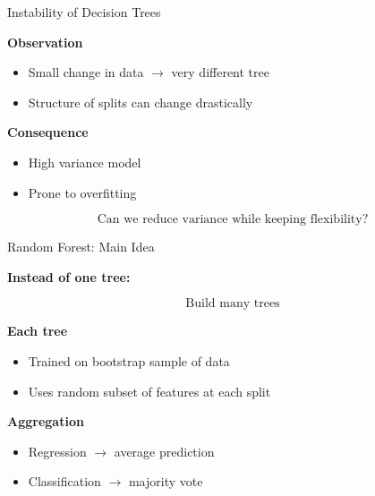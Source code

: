 \documentclass{beamer}
\begin{document}
\begin{frame}{Instability of Decision Trees}

\textbf{Observation}

\begin{itemize}
    \item Small change in data $\rightarrow$ very different tree
    \item Structure of splits can change drastically
\end{itemize}

\vspace{0.4cm}

\textbf{Consequence}

\begin{itemize}
    \item High variance model
    \item Prone to overfitting
\end{itemize}

\vspace{0.4cm}

\[
\text{Can we reduce variance while keeping flexibility?}
\]

\end{frame}

\begin{frame}{Random Forest: Main Idea}

\textbf{Instead of one tree:}

\[
\text{Build many trees}
\]

\vspace{0.4cm}

\textbf{Each tree}

\begin{itemize}
    \item Trained on bootstrap sample of data
    \item Uses random subset of features at each split
\end{itemize}

\vspace{0.4cm}

\textbf{Aggregation}

\begin{itemize}
    \item Regression $\rightarrow$ average prediction
    \item Classification $\rightarrow$ majority vote
\end{itemize}

\end{frame}
\end{document}
